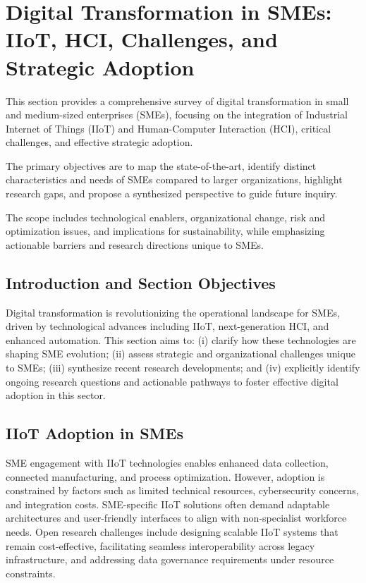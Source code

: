 \documentclass[sigconf]{acmart}
\begin{document}
\section{Digital Transformation in SMEs: IIoT, HCI, Challenges, and Strategic Adoption}

This section provides a comprehensive survey of digital transformation in small and medium-sized enterprises (SMEs), focusing on the integration of Industrial Internet of Things (IIoT) and Human-Computer Interaction (HCI), critical challenges, and effective strategic adoption.

The primary objectives are to map the state-of-the-art, identify distinct characteristics and needs of SMEs compared to larger organizations, highlight research gaps, and propose a synthesized perspective to guide future inquiry.

The scope includes technological enablers, organizational change, risk and optimization issues, and implications for sustainability, while emphasizing actionable barriers and research directions unique to SMEs.

\subsection{Introduction and Section Objectives}

Digital transformation is revolutionizing the operational landscape for SMEs, driven by technological advances including IIoT, next-generation HCI, and enhanced automation. This section aims to: (i) clarify how these technologies are shaping SME evolution; (ii) assess strategic and organizational challenges unique to SMEs; (iii) synthesize recent research developments; and (iv) explicitly identify ongoing research questions and actionable pathways to foster effective digital adoption in this sector.

\subsection{IIoT Adoption in SMEs}

SME engagement with IIoT technologies enables enhanced data collection, connected manufacturing, and process optimization. However, adoption is constrained by factors such as limited technical resources, cybersecurity concerns, and integration costs. SME-specific IIoT solutions often demand adaptable architectures and user-friendly interfaces to align with non-specialist workforce needs. Open research challenges include designing scalable IIoT systems that remain cost-effective, facilitating seamless interoperability across legacy infrastructure, and addressing data governance requirements under resource constraints.
\end{document}
